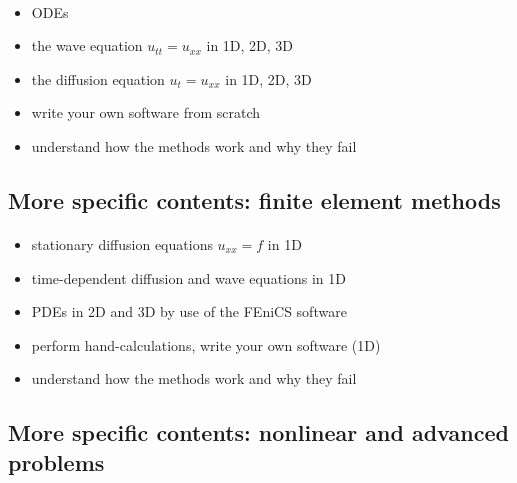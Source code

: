 \documentclass[%
oneside,                 %
final,                   %
10pt]{article}
\begin{document}
\paragraph{}
\begin{itemize}
   \item ODEs

   \item the wave equation $u_{tt}=u_{xx}$ in 1D, 2D, 3D

   \item the diffusion equation $u_t=u_{xx}$ in 1D, 2D, 3D

   \item write your own software from scratch

   \item understand how the methods work and why they fail
\end{itemize}

\noindent



\subsection*{More specific contents: finite element methods}


\paragraph{}
\begin{itemize}
   \item stationary diffusion equations $u_{xx}=f$ in 1D

   \item time-dependent diffusion and wave equations in 1D

   \item PDEs in 2D and 3D by use of the FEniCS software

   \item perform hand-calculations, write your own software (1D)

   \item understand how the methods work and why they fail
\end{itemize}

\noindent



\subsection*{More specific contents: nonlinear and advanced problems}
\end{document}
